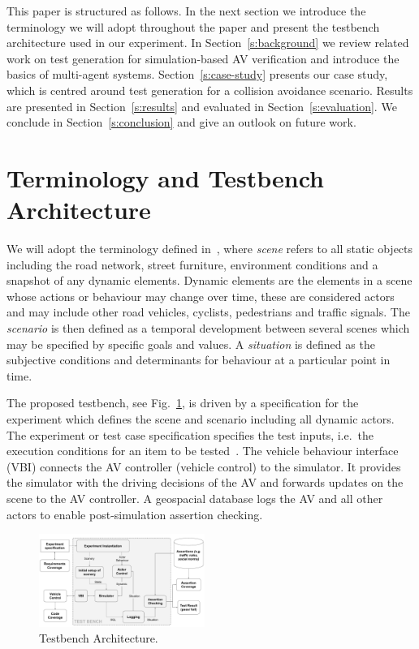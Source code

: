 \documentclass[letterpaper, 10 pt, journal, twoside]{IEEEtran}
\begin{document}
This paper is structured as follows. In the next section we introduce the terminology we will adopt throughout the paper and present the testbench architecture used in our experiment. In Section~\ref{s:background} we review related work on test generation for simulation-based AV verification and introduce the basics of multi-agent systems. Section~\ref{s:case-study} presents our case study, which is centred around test generation for a collision avoidance scenario. Results are presented in Section~\ref{s:results} and evaluated in Section~\ref{s:evaluation}. We conclude in Section~\ref{s:conclusion} and give an outlook on future work. 

\section{Terminology and Testbench Architecture}\label{s:testbench}
We will adopt the terminology defined in~\cite{Ulbrich2015}, where \textit{scene} refers to all static objects including the road network, street furniture, environment conditions and a snapshot of any dynamic elements. Dynamic elements are the elements in a scene whose actions or behaviour may change over time, these are considered actors and may include other road vehicles, cyclists, pedestrians and traffic signals. The \textit{scenario} is then defined as a temporal development between several scenes which may be specified by specific goals and values. A \textit{situation} is defined as the subjective conditions and determinants for behaviour at a particular point in time. 

The proposed testbench, see Fig.~\ref{f:testbench}, is driven by a specification for the experiment which defines the scene and scenario including all dynamic actors. The experiment or test case specification specifies the test inputs, i.e.\ the execution conditions for an item to be tested~\cite{StandardsBoard1990}. The vehicle behaviour interface (VBI) connects the AV controller (vehicle control) to the simulator. It provides the simulator with the driving decisions of the AV and forwards updates on the scene to the AV controller. A geospacial database logs the AV and all other actors to enable post-simulation assertion checking. 

\begin{figure}[!t]
	\centering
\includegraphics[width=0.48\textwidth]{TestBenchMonotone.pdf}
	\caption{Testbench Architecture.}
	\label{f:testbench}
\end{figure}
\end{document}
